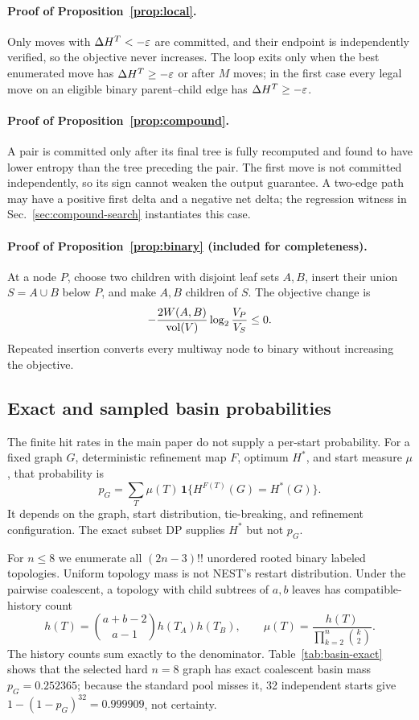 \paragraph{Proof of Proposition~\ref{prop:local}.}
Only moves with $\Delta H^{T}<-\varepsilon$ are committed, and their endpoint is
independently verified, so the objective never increases. The loop exits only
when the best enumerated move has $\Delta H^{T}\ge-\varepsilon$ or after $M$
moves; in the first case every legal move on an eligible binary parent--child
edge has $\Delta H^{T}\ge-\varepsilon$.

\paragraph{Proof of Proposition~\ref{prop:compound}.}
A pair is committed only after its final tree is fully recomputed and found to
have lower entropy than the tree preceding the pair. The first move is not
committed independently, so its sign cannot weaken the output guarantee. A
two-edge path may have a positive first delta and a negative net delta; the
regression witness in Sec.~\ref{sec:compound-search} instantiates this case.

\paragraph{Proof of Proposition~\ref{prop:binary} (included for completeness).}
At a node $P$, choose two children with disjoint leaf sets $A,B$, insert their
union $S=A\cup B$ below $P$, and make $A,B$ children of $S$. The objective
change is
\[
 -\frac{2W(A,B)}{\operatorname{vol}(V)}\log_2\frac{V_P}{V_S}\le 0.
\]
Repeated insertion converts every multiway node to binary without increasing
the objective.

\ifdefined\fullappendix
\subsection{Exact and sampled basin probabilities}\label{app:basin}
The finite hit rates in the main paper do not supply a per-start probability.
For a fixed graph $G$, deterministic refinement map $F$, optimum $H^*$, and
start measure $\mu$, that probability is
\[
 p_G=\sum_T \mu(T)\,\mathbf{1}\{H^{F(T)}(G)=H^*(G)\}.
\]
It depends on the graph, start distribution, tie-breaking, and refinement
configuration.  The exact subset DP supplies $H^*$ but not $p_G$.

For $n\leq 8$ we enumerate all $(2n-3)!!$ unordered rooted binary labeled
topologies.  Uniform topology mass is not NEST's restart distribution. Under
the pairwise coalescent, a topology with child subtrees of $a,b$ leaves has
compatible-history count
\[
 h(T)=\binom{a+b-2}{a-1}h(T_A)h(T_B),\qquad
 \mu(T)=\frac{h(T)}{\prod_{k=2}^{n}\binom{k}{2}}.
\]
The history counts sum exactly to the denominator. Table~\ref{tab:basin-exact}
shows that the selected hard $n=8$ graph has exact coalescent basin mass
$p_G=0.252365$; because the standard pool misses it, 32 independent starts
give $1-(1-p_G)^{32}=0.999909$, not certainty.

